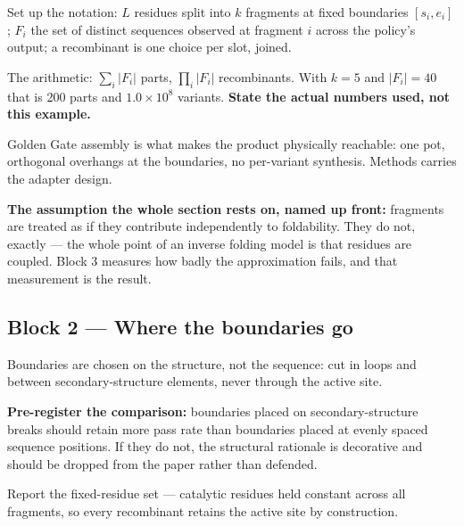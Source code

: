 \begin{planlist}
  \item Set up the notation: $L$ residues split into $k$ fragments at fixed
        boundaries $[s_i, e_i]$; $F_i$ the set of distinct sequences observed at
        fragment $i$ across the policy's output; a recombinant is one choice per
        slot, joined.
  \item The arithmetic: $\sum_i |F_i|$ parts, $\prod_i |F_i|$ recombinants. With
        $k = 5$ and $|F_i| = 40$ that is 200 parts and $1.0 \times 10^8$
        variants. \textbf{State the actual numbers used, not this example.}
  \item Golden Gate assembly is what makes the product physically reachable:
        one pot, orthogonal overhangs at the boundaries, no per-variant
        synthesis. Methods carries the adapter design.
  \item \textbf{The assumption the whole section rests on, named up front:}
        fragments are treated as if they contribute independently to
        foldability. They do not, exactly --- the whole point of an inverse
        folding model is that residues are coupled. Block 3 measures how badly
        the approximation fails, and that measurement is the result.
\end{planlist}

\subsection*{Block 2 --- Where the boundaries go}

\begin{planlist}
  \item Boundaries are chosen on the structure, not the sequence: cut in loops
        and between secondary-structure elements, never through the active site.
  \item \textbf{Pre-register the comparison:} boundaries placed on
        secondary-structure breaks should retain more pass rate than boundaries
        placed at evenly spaced sequence positions. If they do not, the
        structural rationale is decorative and should be dropped from the paper
        rather than defended.
  \item Report the fixed-residue set --- catalytic residues held constant across
        all fragments, so every recombinant retains the active site by
        construction.
\end{planlist}

